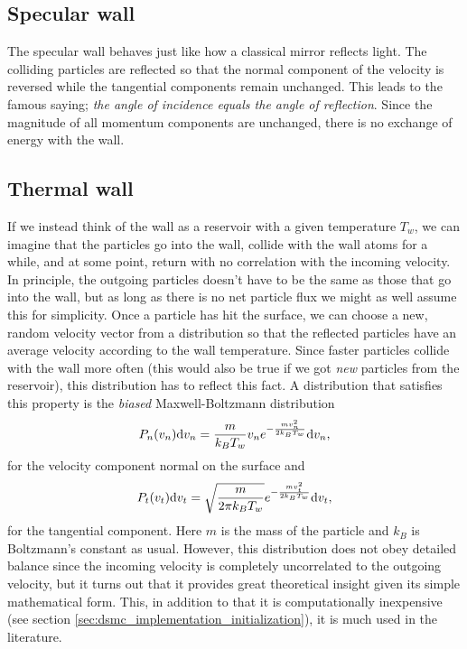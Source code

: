 \subsection{Specular wall}
The specular wall behaves just like how a classical mirror reflects light. The colliding particles are reflected so that the normal component of the velocity is reversed while the tangential components remain unchanged. This leads to the famous saying; \textit{the angle of incidence equals the angle of reflection}. Since the magnitude of all momentum components are unchanged, there is no exchange of energy with the wall. 

\subsection{Thermal wall}
If we instead think of the wall as a reservoir with a given temperature $T_w$, we can imagine that the particles go into the wall, collide with the wall atoms for a while, and at some point, return with no correlation with the incoming velocity. In principle, the outgoing particles doesn't have to be the same as those that go into the wall, but as long as there is no net particle flux we might as well assume this for simplicity. Once a particle has hit the surface, we can choose a new, random velocity vector from a distribution so that the reflected particles have an average velocity according to the wall temperature. Since faster particles collide with the wall more often (this would also be true if we got \textit{new} particles from the reservoir), this distribution has to reflect this fact. A distribution that satisfies this property is the \textit{biased} Maxwell-Boltzmann distribution\cite{alexander1997direct} 
\begin{align}
	P_n(v_n)\mathrm{d}v_n = \frac{m}{k_BT_w}v_n e^{-\frac{mv_n^2}{2k_BT_w}} \mathrm{d}v_n,
\end{align}
for the velocity component normal on the surface and
\begin{align}
	P_t(v_t)\mathrm{d}v_t = \sqrt\frac{m}{2\pi k_BT_w}e^{-\frac{mv_t^2}{2k_BT_w}} \mathrm{d}v_t,
\end{align}
for the tangential component. Here $m$ is the mass of the particle and $k_B$ is Boltzmann's constant as usual. However, this distribution does not obey detailed balance since the incoming velocity is completely uncorrelated to the outgoing velocity, but it turns out that it provides great theoretical insight given its simple mathematical form. This, in addition to that it is computationally inexpensive (see section \ref{sec:dsmc_implementation_initialization}), it is much used in the literature. 

